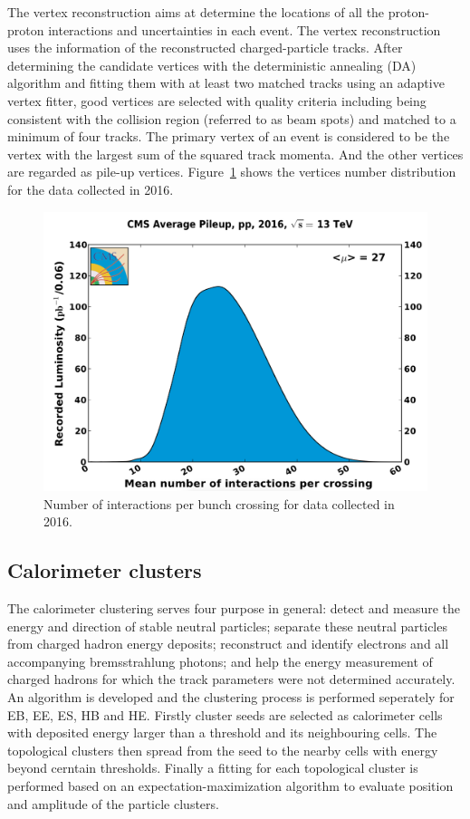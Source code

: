 \vspace{0.3cm}
The vertex reconstruction aims at determine the locations of all the proton-proton interactions and uncertainties in each event. The vertex reconstruction uses the information of the reconstructed charged-particle tracks. After determining the candidate vertices with the deterministic annealing (DA) algorithm and fitting them with at least two matched tracks using an adaptive vertex fitter, good vertices are selected with quality criteria including being consistent with the collision region (referred to as beam spots) and matched to a minimum of four tracks. The primary vertex of an event is considered to be the vertex with the largest sum of the squared track momenta. And the other vertices are regarded as pile-up vertices. Figure~\ref{fig:ob_Nvertex} shows the vertices number distribution for the data collected in 2016.
\begin{figure}[htbp]
\begin{center}
\includegraphics[width=0.72\linewidth]{figures/ob_Nvertex.png}
\caption{Number of interactions per bunch crossing for data collected in 2016.}
\label{fig:ob_Nvertex}
\end{center}
\end{figure}

\subsection{Calorimeter clusters}
The calorimeter clustering serves four purpose in general: detect and measure the energy and direction of stable neutral particles; separate these neutral particles from charged hadron energy deposits; reconstruct and identify electrons and all accompanying bremsstrahlung photons; and help the energy measurement of charged hadrons for which the track parameters were not determined accurately. An algorithm is developed and the clustering process is performed seperately for EB, EE, ES, HB and HE. Firstly cluster seeds are selected as calorimeter cells with deposited energy larger than a threshold and its neighbouring cells. The topological clusters then spread from the seed to the nearby cells with energy beyond cerntain thresholds. Finally a fitting for each topological cluster is performed based on an expectation-maximization algorithm to evaluate position and amplitude of the particle clusters. 

